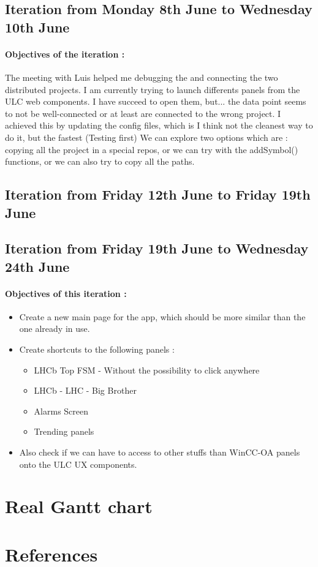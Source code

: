 \documentclass[a4paper, 12pt]{article}
\begin{document}
\begin{appendix}
\subsection{Iteration from Monday 8th June to Wednesday 10th June}
\paragraph{Objectives of the iteration :}
The meeting with Luis helped me debugging the and connecting the two distributed projects. I am currently trying to launch differents panels from the ULC web components.
I have succeed to open them, but... the data point seems to not be well-connected or at least are connected to the wrong project.
I achieved this by updating the config files, which is I think not the cleanest way to do it, but the fastest (Testing first)
We can explore two options which are : copying all the project in a special repos, or we can try with the addSymbol() functions, or we can also try to copy all the paths.

\subsection{Iteration from Friday 12th June to Friday 19th June}
\subsection{Iteration from Friday 19th June to Wednesday 24th June}
\paragraph{Objectives of this iteration :}
\begin{itemize}
    \item Create a new main page for the app, which should be more similar than the one already in use.
    \item Create shortcuts to the following panels :
    \begin{itemize}
        \item LHCb Top FSM - Without the possibility to click anywhere
        \item LHCb - LHC - Big Brother
        \item Alarms Screen
        \item Trending panels
    \end{itemize}
    \item Also check if we can have to access to other stuffs than WinCC-OA panels onto the ULC UX components.
\end{itemize}

\newpage
\section{Real Gantt chart}
\end{appendix}

\newpage
\section{References}
\nocite{*}
\printbibliography[heading=subbibintoc,type=article,title={Bibliography}]
\printbibliography[heading=subbibintoc,type=misc,title={Webography}]
\end{document}
